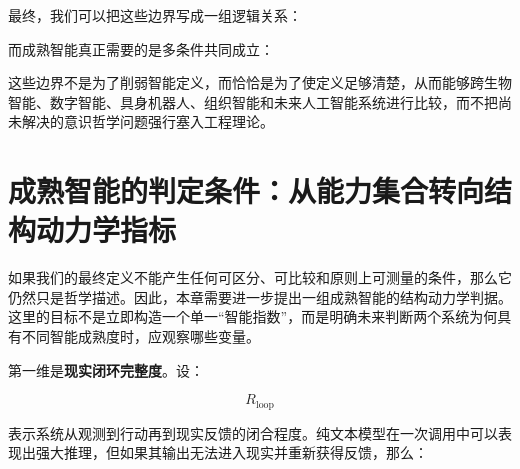 最终，我们可以把这些边界写成一组逻辑关系：

\begin{statementbox}
\centering
{}
\end{statementbox}

\begin{statementbox}
\centering
{}
\end{statementbox}

\begin{statementbox}
\centering
{}
\end{statementbox}

\begin{statementbox}
\centering
{}
\end{statementbox}

而成熟智能真正需要的是多条件共同成立：

\begin{statementbox}
\centering
{}
\end{statementbox}

这些边界不是为了削弱智能定义，而恰恰是为了使定义足够清楚，从而能够跨生物智能、数字智能、具身机器人、组织智能和未来人工智能系统进行比较，而不把尚未解决的意识哲学问题强行塞入工程理论。

\section{成熟智能的判定条件：从能力集合转向结构动力学指标}

如果我们的最终定义不能产生任何可区分、可比较和原则上可测量的条件，那么它仍然只是哲学描述。因此，本章需要进一步提出一组成熟智能的结构动力学判据。这里的目标不是立即构造一个单一“智能指数”，而是明确未来判断两个系统为何具有不同智能成熟度时，应观察哪些变量。

第一维是\textbf{现实闭环完整度}。设：

\[
R_{\mathrm{loop}}
\]

表示系统从观测到行动再到现实反馈的闭合程度。纯文本模型在一次调用中可以表现出强大推理，但如果其输出无法进入现实并重新获得反馈，那么：

